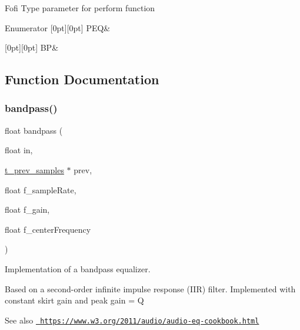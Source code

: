 Fofi Type parameter for perform function \begin{DoxyEnumFields}{Enumerator}
[0pt][0pt]{}\mbox{\label{fofi~_8c_ae6be347e31c48fcae5108f6db7a8bcfda4579b52acef1f8eda7cbb6a2337346b0}} 
P\+EQ&\\
\hline

[0pt][0pt]{}\mbox{\label{fofi~_8c_ae6be347e31c48fcae5108f6db7a8bcfdaf5a5119c2b95cc7f4f3e20f56576ee3e}} 
BP&\\
\hline

\end{DoxyEnumFields}


\subsection{Function Documentation}
\mbox{\label{fofi~_8c_a79bf4da8324cab6a31c4439c746821d8}} 
\subsubsection{\texorpdfstring{bandpass()}{bandpass()}}
{\footnotesize\ttfamily float bandpass (\begin{DoxyParamCaption}\item[{float}]{in,  }\item[{\mbox{\hyperlink{fofi~_8h_a728138bbe23514a1927f1f686090cd52}{t\+\_\+prev\+\_\+samples}} $\ast$}]{prev,  }\item[{float}]{f\+\_\+sample\+Rate,  }\item[{float}]{f\+\_\+gain,  }\item[{float}]{f\+\_\+center\+Frequency }\end{DoxyParamCaption})}



Implementation of a bandpass equalizer. 

Based on a second-\/order infinite impulse response (I\+IR) filter. Implemented with constant skirt gain and peak gain = Q \begin{DoxySeeAlso}{See also}
\href{https://www.w3.org/2011/audio/audio-eq-cookbook.html}{\texttt{ https\+://www.\+w3.\+org/2011/audio/audio-\/eq-\/cookbook.\+html}}
\end{DoxySeeAlso}

